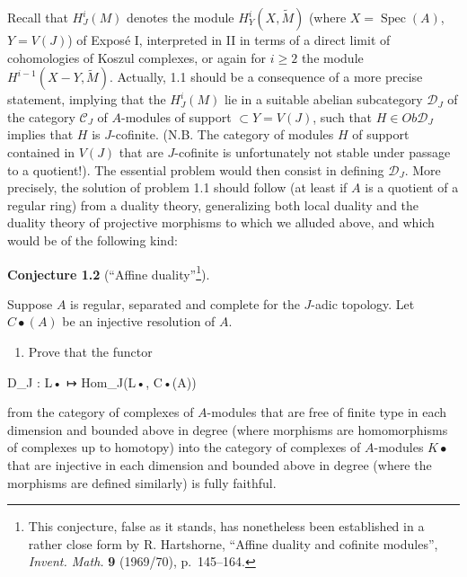 \documentclass[
]{article}
\newenvironment{Shaded}{}{}
\newcommand{\NormalTok}[1]{#1}
\providecommand{\tightlist}{%
  \setlength{\itemsep}{0pt}\setlength{\parskip}{0pt}}
\begin{document}
Recall that \(H^{i}_{J}(M)\) denotes the module
\(H^{i}_{Y}(X, \tilde{M})\) (where \(X = \operatorname{Spec}(A)\),
\(Y = V(J)\)) of Exposé I, interpreted in II in terms of a direct limit
of cohomologies of Koszul complexes, or again for \(i \geqslant 2\) the
module \(H^{i-1}(X - Y, \tilde{M})\). Actually, 1.1 should be a
consequence of a more precise statement, implying that the
\(H^{i}_{J}(M)\) lie in a suitable abelian subcategory
\(\mathcal{D}_{J}\) of the category \(\mathcal{C}_{J}\) of \(A\)-modules
of support \(\subset Y = V(J)\), such that \(H \in Ob \mathcal{D}_{J}\)
implies that \(H\) is \(J\)-cofinite. (N.B. The category of modules
\(H\) of support contained in \(V(J)\) that are \(J\)-cofinite is
unfortunately not stable under passage to a quotient!). The essential
problem would then consist in defining \(\mathcal{D}_{J}\). More
precisely, the solution of problem 1.1 should follow (at least if \(A\)
is a quotient of a regular ring) from a duality theory, generalizing
both local duality and the duality theory of projective morphisms to
which we alluded above, and which would be of the following kind:

\textbf{Conjecture 1.2} (``Affine duality''\footnote{This conjecture,
  false as it stands, has nonetheless been established in a rather close
  form by R. Hartshorne, ``Affine duality and cofinite modules'',
  \emph{Invent. Math.} \textbf{9} (1969/70), p.~145--164.}).

Suppose \(A\) is regular, separated and complete for the \(J\)-adic
topology. Let \(C\bullet(A)\) be an injective resolution of \(A\).

\begin{enumerate}
\def\labelenumi{(\roman{enumi})}
\tightlist
\item
  Prove that the functor
\end{enumerate}

\begin{Shaded}
\begin{Highlighting}[]
\NormalTok{D\_J : L• ↦ Hom\_J(L•, C•(A))}
\end{Highlighting}
\end{Shaded}

from the category of complexes of \(A\)-modules that are free of finite
type in each dimension and bounded above in degree (where morphisms are
homomorphisms of complexes up to homotopy) into the category of
complexes of \(A\)-modules \(K\bullet\) that are injective in each
dimension and bounded above in degree (where the morphisms are defined
similarly) is fully faithful.
\end{document}
